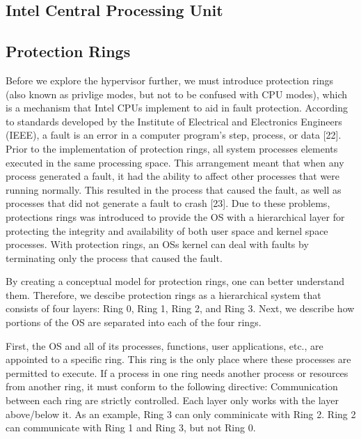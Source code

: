 \documentclass{report}
\begin{document}
\begin{spacing}{1.5}
\section{Intel Central Processing Unit}





\subsection{Protection Rings}

{\large
Before we explore the hypervisor further, we must introduce protection rings (also known as privlige modes, but not to be confused with CPU modes), which is a mechanism that Intel CPUs implement to aid in fault protection. According to standards developed by the Institute of Electrical and Electronics Engineers (IEEE), a fault is an error in a computer program's step, process, or data [22]. Prior to the implementation of protection rings, all system processes elements executed in the same processing space. This arrangement meant that when any process generated a fault, it had the ability to affect other processes that were running normally. This resulted in the process that caused the fault, as well as processes that did not generate a fault to crash [23]. Due to these problems, protections rings was introduced to provide the OS with a hierarchical layer for protecting the integrity and availability of both user space and kernel space processes. With protection rings, an OSs kernel can deal with faults by terminating only the process that caused the fault. 
\newline
}

{\large
By creating a conceptual model for protection rings, one can better understand them. Therefore, we descibe protection rings as a hierarchical system that consists of four layers: Ring 0, Ring 1, Ring 2, and Ring 3. Next, we describe how portions of the OS are separated into each of the four rings.
\newline
}

{\large
First, the OS and all of its processes, functions, user applications, etc., are appointed to a specific ring. This ring is the only place where these processes are permitted to execute. If a process in one ring needs another process or resources from another ring, it must conform to the following directive:
\newline
Communication between each ring are strictly controlled. Each layer only works with the layer above/below it. As an example, Ring 3 can only comminicate with Ring 2. Ring 2 can communicate with Ring 1 and Ring 3, but not Ring 0.
\newline
}


\end{spacing}
\end{document}

